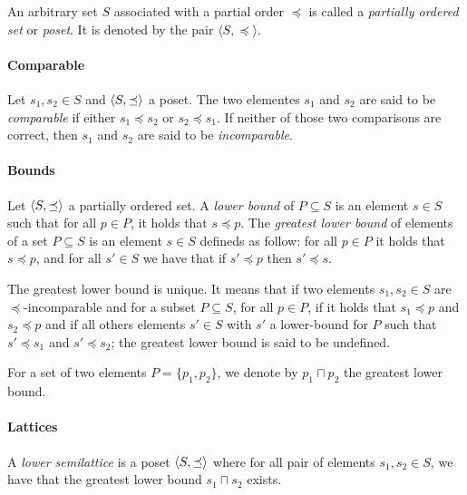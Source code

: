 \documentclass[11pt,a4paper]{article}
\DeclarePairedDelimiter{\tuple}{\langle}{\rangle}
\theoremstyle{definition}
\begin{document}
An arbitrary set $S$ associated with a partial order $\preceq$
is called a \textit{partially ordered set} or \textit{poset}.
It is denoted by the pair $\langle S, \preceq \rangle$.

\paragraph{Comparable}

Let $s_1, s_2 \in S$ and $\tuple{S, \preceq}$ a poset.
The two elementes $s_1$ and $s_2$ are said to be \textit{comparable} if either
$s_1 \preceq s_2$ or $s_2 \preceq s_1$. If neither of those two comparisons
are correct, then $s_1$ and $s_2$ are said to be \textit{incomparable}.


\paragraph{Bounds} Let $\tuple{S, \preceq}$ a partially ordered set.
A \textit{lower bound} of $P \subseteq S$ is an element $s \in S$
such that for all $p \in P$, it holds that $s \preceq p$.
The \textit{greatest lower bound} of elements of a set $P \subseteq S$
is an element $s \in S$ defineds as follow:
for all $p \in P$
it holds that $s \preceq p$, and for all $s' \in S$ we have that
if $s' \preceq p$ then $s' \preceq s$.

The greatest lower bound is unique. It means that if two elements
$s_1, s_2 \in S$ are $\preceq$-incomparable and for a subset $P \subseteq S$,
for all $p \in P$, if it holds that $s_1 \preceq p$ and $s_2 \preceq p$
and if all others elements $s' \in S$ with $s'$ a lower-bound
for $P$ such that $s' \preceq s_1$ and $s' \preceq s_2$;
the greatest lower bound is said to be undefined.

For a set of two elements
$P = \{p_1, p_2\}$, we denote by $p_1 \sqcap p_2$ the greatest lower bound.

\paragraph{Lattices} A \textit{lower semilattice} is a poset
$\tuple{S, \preceq}$ where for all pair of elements $s_1, s_2 \in S$,
we have that the greatest lower bound $s_1 \sqcap s_2$ exists.


\end{document}
